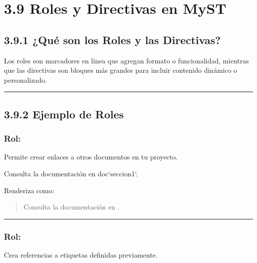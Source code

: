 \documentclass[a4paper,10pt,spanish]{sphinxmanual}
\begin{document}
\section{3.9 Roles y Directivas en MyST}
\label{\detokenize{3_guia_myst/roles:roles-y-directivas-en-myst}}\label{\detokenize{3_guia_myst/roles::doc}}

\subsection{3.9.1 ¿Qué son los Roles y las Directivas?}
\label{\detokenize{3_guia_myst/roles:que-son-los-roles-y-las-directivas}}
\sphinxAtStartPar
Los roles son marcadores en línea que agregan formato o funcionalidad, mientras que las directivas son bloques más grandes para incluir contenido dinámico o personalizado.


\bigskip\hrule\bigskip



\subsection{3.9.2 Ejemplo de Roles}
\label{\detokenize{3_guia_myst/roles:ejemplo-de-roles}}

\subsubsection{Rol: }
\label{\detokenize{3_guia_myst/roles:rol-doc}}
\sphinxAtStartPar
Permite crear enlaces a otros documentos en tu proyecto.

\begin{sphinxVerbatim}[commandchars=\\\{\}]
Consulta la documentación en \PYGZob{}doc\PYGZcb{}`seccion1`.
\end{sphinxVerbatim}

\sphinxAtStartPar
Renderiza como:
\begin{quote}

\sphinxAtStartPar
Consulta la documentación en .
\end{quote}


\bigskip\hrule\bigskip



\subsubsection{Rol: }
\label{\detokenize{3_guia_myst/roles:rol-ref}}
\sphinxAtStartPar
Crea referencias a etiquetas definidas previamente.
\end{document}
